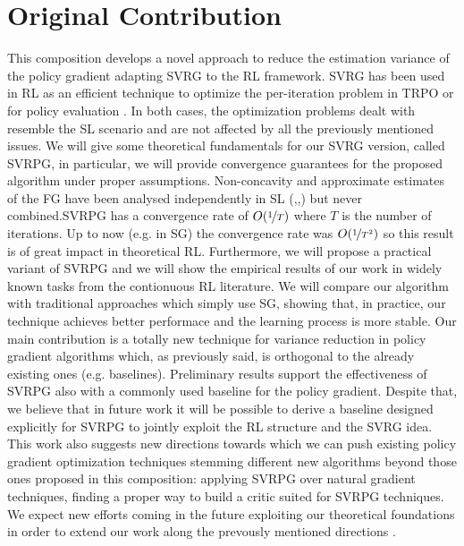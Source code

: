 \section{Original Contribution}
This composition develops a novel approach to reduce the estimation variance of the policy gradient adapting \acs{SVRG} to the \acs{RL} framework.\newline 
\acs{SVRG} has been used in \acs{RL} as an efficient technique to optimize the per-iteration problem in \ac{TRPO} \citep{xu2017stochastic} or for policy evaluation \citep{du2017stochastic}. In both cases, the optimization problems dealt with resemble the \acs{SL} scenario and are not affected by all the previously mentioned issues.
We will give some theoretical fundamentals for our \acs{SVRG} version, called \acs{SVRPG}, in particular, we will provide convergence guarantees for the proposed algorithm under proper assumptions. Non-concavity and approximate estimates of the \acf{FG} have been analysed independently in \acs{SL} (\cite{allen2016variance},\cite{reddi2016stochastic},\cite{harikandeh2015stopwasting}) but never combined.\newline \acf{SVRPG} has a convergence rate of $O(\nicefrac{1}{T})$ where $T$ is the number of iterations. Up to now (e.g. in \acs{SG}) the convergence rate was  $O(\nicefrac{1}{T^2})$ so this result is of great impact in theoretical \acs{RL}.\newline
 Furthermore, we will propose a practical variant of \acs{SVRPG} and we will show the empirical results of our work in widely known tasks from the contionuous \acs{RL} literature. We will compare our algorithm with traditional approaches which simply use \acs{SG}, showing that, in practice, our technique achieves better performace and the learning process is more stable.\newline
Our main contribution is a totally new technique for variance reduction in policy gradient algorithms which, as previously said, is orthogonal to the already existing ones (e.g. baselines).
Preliminary results support the effectiveness of \acs{SVRPG} also with a commonly used baseline for the policy gradient. Despite that, we believe that in future work it will be possible to derive a baseline designed explicitly for \acs{SVRPG} to jointly exploit the \acs{RL} structure and the \acs{SVRG} idea.\newline
This work also suggests new directions towards which we can push existing policy gradient optimization techniques stemming different new algorithms beyond those ones proposed in this composition: applying \acs{SVRPG} over natural gradient techniques, finding a proper way to build a critic suited for \acs{SVRPG} techniques. We expect new efforts coming in the future exploiting our theoretical foundations in order to extend our work along the prevously mentioned directions .\newline
